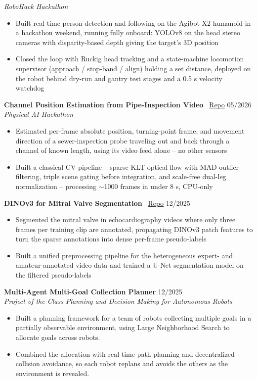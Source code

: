 \documentclass[a4paper,10pt]{article}
\begin{document}
\textit{RoboHack Hackathon}
\begin{itemize}
    \vspace{-5pt}
    \item Built real-time person detection and following on the Agibot X2 humanoid in a hackathon weekend, running fully onboard: YOLOv8 on the head stereo cameras with disparity-based depth giving the target's 3D position
    \item Closed the loop with Ruckig head tracking and a state-machine locomotion supervisor (approach / stop-band / align) holding a set distance, deployed on the robot behind dry-run and gantry test stages and a 0.5 s velocity watchdog
\end{itemize}
\textbf{Channel Position Estimation from Pipe-Inspection Video} \faGithub\ \href{https://github.com/MatteoR1103/PhysicalAI-Hackathon}{Repo} \hfill 05/2026\\
\textit{Physical AI Hackathon}
\begin{itemize}
    \vspace{-5pt}
    \item Estimated per-frame absolute position, turning-point frame, and movement direction of a sewer-inspection probe traveling out and back through a channel of known length, using its video feed alone -- no other sensors
    \item Built a classical-CV pipeline -- sparse KLT optical flow with MAD outlier filtering, triple scene gating before integration, and scale-free dual-leg normalization -- processing $\sim$1000 frames in under 8 s, CPU-only
\end{itemize}
\textbf{DINOv3 for Mitral Valve Segmentation} \faGithub\ \href{https://github.com/alessiosalvatore1703-ops/DINO-v3-for-Mitral-Valve-Segmentation}{Repo} \hfill 12/2025
\begin{itemize}
    \vspace{-5pt}
    \item Segmented the mitral valve in echocardiography videos where only three frames per training clip are annotated, propagating DINOv3 patch features to turn the sparse annotations into dense per-frame pseudo-labels
    \item Built a unified preprocessing pipeline for the heterogeneous expert- and amateur-annotated video data and trained a U-Net segmentation model on the filtered pseudo-labels
\end{itemize}
\textbf{Multi-Agent Multi-Goal Collection Planner}  \hfill 12/2025\\
\textit{Project of the Class Planning and Decision Making for Autonomous Robots}
\begin{itemize}
\vspace{-5pt}
    \item Built a planning framework for a team of robots collecting multiple goals in a partially observable environment, using Large Neighborhood Search to allocate goals across robots.
    \item Combined the allocation with real-time path planning and decentralized collision avoidance, so each robot replans and avoids the others as the environment is revealed.
\end{itemize}
 
\end{document}
